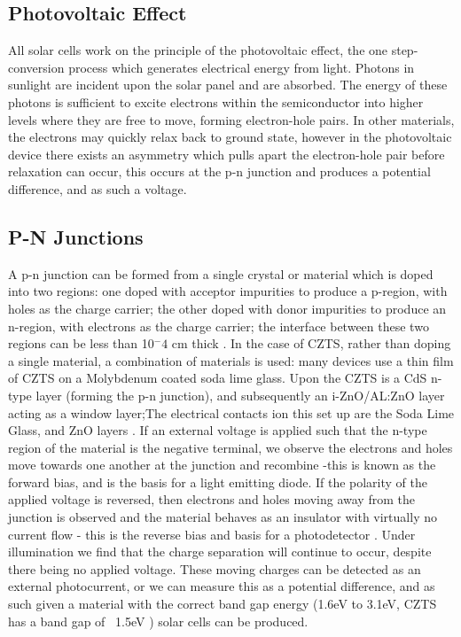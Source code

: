 \subsection{Photovoltaic Effect}

All solar cells work on the principle of the photovoltaic effect, the one step-conversion process which generates electrical energy from light. Photons in sunlight are incident upon the solar panel and are absorbed. The energy of these photons is sufficient to excite electrons within the semiconductor into higher levels where they are free to move, forming electron-hole pairs. In other materials, the electrons may quickly  relax back to ground state, however in the photovoltaic device there exists an asymmetry which pulls apart the electron-hole pair before relaxation can occur, this occurs at the p-n junction and produces a potential difference, and as such a voltage.



\subsection{P-N Junctions}

A p-n junction can be formed from a single crystal or material which is doped into two regions: one doped with acceptor impurities to produce a p-region, with holes as the charge carrier; the other doped with donor impurities to produce an n-region, with electrons as the charge carrier; the interface between these two regions can be less than 10$^-4$ cm thick \citep{Kittel2004}.  In the case of CZTS, rather than doping a single material, a combination of materials is used: many devices use a thin film of CZTS on a Molybdenum coated soda lime glass. Upon the CZTS is a CdS n-type layer (forming the p-n junction), and subsequently an i-ZnO/AL:ZnO layer acting as a window layer;The electrical contacts ion this set up are the Soda Lime Glass, and ZnO layers \citep{Wang2011}.
If an external voltage is applied such that the n-type region of the material is the negative terminal, we observe the electrons and holes move towards one another at the junction and recombine -this is  known as the forward bias, and is the basis for a light emitting diode.
If the polarity of the applied voltage is reversed, then electrons and holes moving away from the junction is observed and the material behaves as an insulator with virtually no current flow -  this is the reverse bias and basis for a photodetector \citep{Askeland2010}. Under illumination we find that the charge separation will continue to occur, despite there being no applied voltage. These moving charges can be detected as an external photocurrent, or we can measure this as a potential difference, and as such given a material with the correct band gap energy (1.6eV to 3.1eV, CZTS has a band gap of ~1.5eV \citep{JJAP.48.090202,Katagiri2001}) solar cells can be produced.
